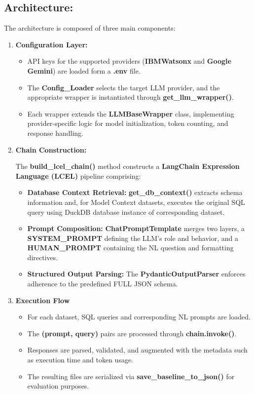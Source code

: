 \subsection{Architecture:}
The architecture is composed of three main components:
\begin{enumerate}
    \item \textbf{Configuration Layer:} 
    \begin{itemize}
        \item API keys for the supported providers (\textbf{IBMWatsonx} and \textbf{Google Gemini}) are loaded form a \textbf{.env} file.
        \item The \textbf{Config\_Loader} selects the target LLM provider, and the appropriate wrapper is instantiated through \textbf{get\_llm\_wrapper()}.
        \item Each wrapper extends the \textbf{LLMBaseWrapper} class, implementing provider-specific logic for model initialization, token counting, and response handling.
    \end{itemize}
    \item \textbf{Chain Construction:}
    
    The \textbf{build\_lcel\_chain()} method constructs a \textbf{LangChain Expression Language (LCEL)} pipeline comprising:
    \begin{itemize}
        \item \textbf{Database Context Retrieval:} \textbf{get\_db\_context()} extracts schema information and, for Model Context datasets, executes the original SQL query using DuckDB database instance of corresponding dataset.
        \item \textbf{Prompt Composition:} \textbf{ChatPromptTemplate} merges two layers, a \textbf{SYSTEM\_PROMPT} defining the LLM's role and behavior, and a \textbf{HUMAN\_PROMPT} containing the NL question and formatting directives.
        \item \textbf{Structured Output Parsing:} The \textbf{PydanticOutputParser} enforces adherence to the predefined FULL JSON schema.
    \end{itemize}
    \item \textbf{Execution Flow}
    \begin{itemize}
        \item For each dataset, SQL queries and corresponding NL prompts are loaded.
        \item The \textbf{(prompt, query)} pairs  are processed through \textbf{chain.invoke()}.
        \item Responses are parsed, validated, and augmented with the metadata such as execution time and token usage.
        \item The resulting files are serialized via \textbf{save\_baseline\_to\_json()} for evaluation purposes.
    \end{itemize}
\end{enumerate}

